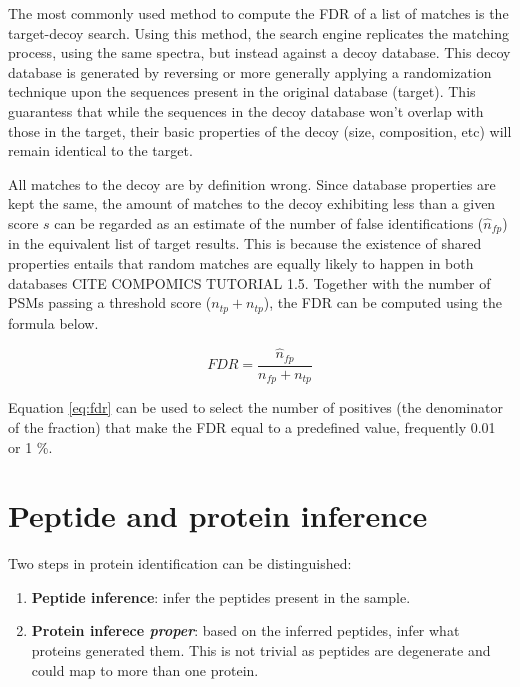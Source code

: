 \documentclass[11pt, a4paper]{report}
\begin{document}
The most commonly used method to compute the FDR of a list of matches is the target-decoy search. Using this method, the search engine replicates the matching process, using the same spectra, but instead against a decoy database. This decoy database is generated by reversing or more generally applying a randomization technique upon the sequences present in the original database (target). This guarantess that while the sequences in the decoy database won't overlap with those in the target, their basic properties of the decoy (size, composition, etc) will remain identical to the target.

All matches to the decoy are by definition wrong. Since database properties 
are kept the same, the amount of matches to the decoy exhibiting less than a given score $s$ can be regarded as an estimate of the number of false identifications ($\hat{n}_{fp}$) in the equivalent list of target results. This is because the existence of shared properties entails that random matches are equally likely to happen in both databases CITE COMPOMICS TUTORIAL 1.5. Together with the number of PSMs passing a threshold score ($n_{tp} + n_{tp}$), the FDR can be computed using the formula below.

\begin{equation}\label{eq:fdr}
FDR = \frac{\hat{n}_{fp}}{n_{fp} + n_{tp}}
\end{equation}

Equation \ref{eq:fdr} can be used to select the number of positives (the denominator of the fraction) that make the FDR equal to a predefined value, frequently 0.01 or 1 \%.

%

\section{Peptide and protein inference}
\label{sec:inference}

Two steps in protein identification can be distinguished:

\begin{enumerate}

\item \textbf{Peptide inference}: infer the peptides present in the sample.
\item \textbf{Protein inferece \textit{proper}}: based on the inferred peptides, infer what proteins generated them. This is not trivial as peptides are degenerate and could map to more than one protein.
\end{enumerate}
\end{document}
